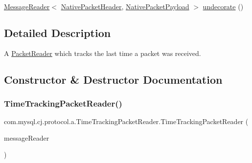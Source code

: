 \begin{DoxyCompactItemize}
\item 
\mbox{\hyperlink{interfacecom_1_1mysql_1_1cj_1_1protocol_1_1_message_reader}{Message\+Reader}}$<$ \mbox{\hyperlink{classcom_1_1mysql_1_1cj_1_1protocol_1_1a_1_1_native_packet_header}{Native\+Packet\+Header}}, \mbox{\hyperlink{classcom_1_1mysql_1_1cj_1_1protocol_1_1a_1_1_native_packet_payload}{Native\+Packet\+Payload}} $>$ \mbox{\hyperlink{classcom_1_1mysql_1_1cj_1_1protocol_1_1a_1_1_time_tracking_packet_reader_aebbbca667b7f55074795c128c2aff259}{undecorate}} ()
\end{DoxyCompactItemize}


\subsection{Detailed Description}
A \mbox{\hyperlink{}{Packet\+Reader}} which tracks the last time a packet was received. 

\subsection{Constructor \& Destructor Documentation}
\mbox{\label{classcom_1_1mysql_1_1cj_1_1protocol_1_1a_1_1_time_tracking_packet_reader_a3ffbfb02e61815c12a359e0f2845766f}} 
\subsubsection{\texorpdfstring{Time\+Tracking\+Packet\+Reader()}{TimeTrackingPacketReader()}}
{\footnotesize\ttfamily com.\+mysql.\+cj.\+protocol.\+a.\+Time\+Tracking\+Packet\+Reader.\+Time\+Tracking\+Packet\+Reader (\begin{DoxyParamCaption}\item[{\mbox{\hyperlink{interfacecom_1_1mysql_1_1cj_1_1protocol_1_1_message_reader}{Message\+Reader}}$<$ \mbox{\hyperlink{classcom_1_1mysql_1_1cj_1_1protocol_1_1a_1_1_native_packet_header}{Native\+Packet\+Header}}, \mbox{\hyperlink{classcom_1_1mysql_1_1cj_1_1protocol_1_1a_1_1_native_packet_payload}{Native\+Packet\+Payload}} $>$}]{message\+Reader }\end{DoxyParamCaption})}



